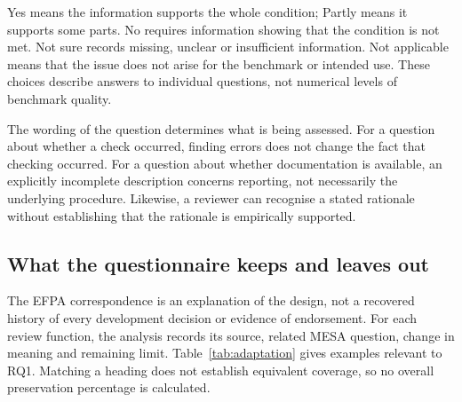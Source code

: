 \documentclass[10pt,conference]{IEEEtran}
\begin{document}
Yes means the information supports the whole condition; Partly means it supports some parts. No requires information showing that the condition is not met. Not sure records missing, unclear or insufficient information. Not applicable means that the issue does not arise for the benchmark or intended use. These choices describe answers to individual questions, not numerical levels of benchmark quality.

The wording of the question determines what is being assessed. For a question about whether a check occurred, finding errors does not change the fact that checking occurred. For a question about whether documentation is available, an explicitly incomplete description concerns reporting, not necessarily the underlying procedure. Likewise, a reviewer can recognise a stated rationale without establishing that the rationale is empirically supported.

\subsection{What the questionnaire keeps and leaves out}
The EFPA correspondence is an explanation of the design, not a recovered history of every development decision or evidence of endorsement. For each review function, the analysis records its source, related MESA question, change in meaning and remaining limit. Table~\ref{tab:adaptation} gives examples relevant to RQ1. Matching a heading does not establish equivalent coverage, so no overall preservation percentage is calculated.
\end{document}
